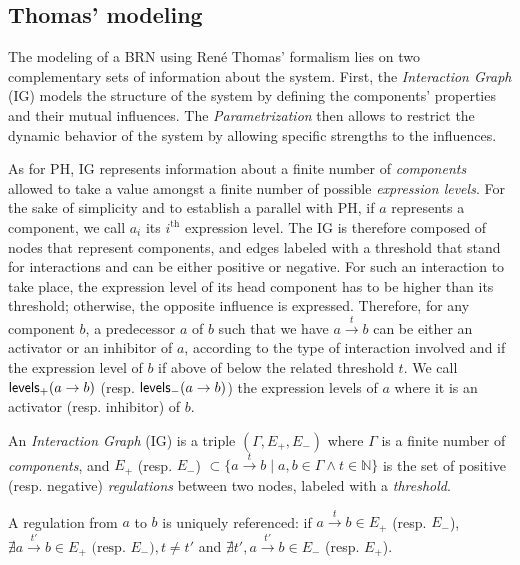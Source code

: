 \subsection{Thomas' modeling}

The modeling of a BRN using René Thomas' formalism lies on two complementary sets of information about the system. First, the \emph{Interaction Graph} (IG) models the structure of the system by defining the components' properties and their mutual influences. The \emph{Parametrization} then allows to restrict the dynamic behavior of the system by allowing specific strengths to the influences.

As for PH, IG represents information about a finite number of \emph{components} allowed to take a value amongst a finite number of possible \emph{expression levels}.
For the sake of simplicity and to establish a parallel with PH, if $a$ represents a component, we call $a_i$ its $i^\text{th}$ expression level.
The IG is therefore composed of nodes that represent components, and edges labeled with a threshold that stand for interactions and can be either positive or negative.
For such an interaction to take place, the expression level of its head component has to be higher than its threshold; otherwise, the opposite influence is expressed.
Therefore, for any component $b$, a predecessor $a$ of $b$ such that we have $a \xrightarrow{t} b$ can be either an activator or an inhibitor of $a$, according to the type of interaction involved and if the expression level of $b$ if above of below the related threshold $t$.
We call $\mathsf{levels}_+(a\rightarrow b)$ (resp. $\mathsf{levels}_-(a\rightarrow b)$) the expression levels of $a$ where it is an activator (resp. inhibitor) of $b$.

\begin{definition}
\label{def:ig}
An \emph{Interaction Graph} (IG) is a triple $(\Gamma, E_+, E_-)$ where $\Gamma$ is a finite number of \emph{components},
and $E_+$ (resp. $E_-$) $\subset \{a \xrightarrow{t} b \mid a, b \in \Gamma \wedge t \in \mathbb{N}\}$
is the set of positive (resp. negative) \emph{regulations} between two nodes, labeled with a \emph{threshold}.

A regulation from $a$ to $b$ is uniquely referenced:
if $a \xrightarrow{t} b \in E_+$ (resp. $E_-$),
$\nexists a \xrightarrow{t'} b \in E_+ \text{ (resp. $E_-$)}, t \neq t'$
and $\nexists t', a \xrightarrow{t'} b \in E_-$ (resp. $E_+$).
\end{definition}

